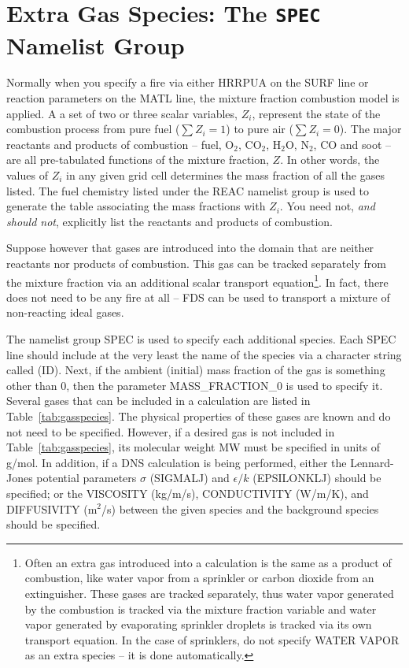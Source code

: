\documentclass[11pt]{book}
\begin{document}
\section{Extra Gas Species: The \texorpdfstring{{\tt SPEC}}{SPEC} Namelist Group}
\label{info:SPEC}

Normally when you specify a fire via either {\ct HRRPUA} on the {\ct SURF} line or
reaction parameters on the {\ct MATL} line, the mixture fraction combustion model
is applied. A a set of two or three scalar variables, $Z_i$, represent the state of
the combustion process from pure fuel ($\sum Z_i=1$) to pure air ($\sum Z_i=0$).
The major reactants and products of combustion -- fuel, O$_2$, CO$_2$,
H$_2$O, N$_2$, CO and soot -- are all pre-tabulated functions of
the mixture fraction, $Z$. In other words, the values of $Z_i$ in any
given grid cell determines the mass fraction of all the gases listed.
The fuel chemistry listed under the {\ct REAC} namelist
group is used to generate the table associating the mass fractions
with $Z_i$. You need not, {\em and should not},
explicitly list the reactants and products of combustion.

Suppose however that gases are introduced into the
domain that are neither reactants nor products of combustion.
This gas can be tracked separately from the mixture fraction via an additional scalar transport equation\footnote{
Often an extra gas introduced into a calculation is the same as a
product of combustion, like water vapor from a sprinkler or carbon
dioxide from an extinguisher. These gases are tracked separately,
thus water vapor generated by the combustion is tracked via the
mixture fraction variable and water vapor generated by evaporating
sprinkler droplets is tracked via its own transport equation. In the
case of sprinklers, do not specify {\ct WATER VAPOR} as
an extra species -- it is done automatically.}.
In fact, there does not need to be any fire
at all -- FDS can be used to transport a mixture of non-reacting
ideal gases.

The namelist group {\ct SPEC} is used to specify each additional
species. Each {\ct SPEC} line should include at the very least
the name of the species via a character string called ({\ct ID}).
Next, if the ambient (initial) mass fraction of the gas is something
other than 0, then the parameter {\ct MASS\_FRACTION\_0} is used to
specify it.
Several gases that can be included in a calculation are listed in
Table~\ref{tab:gasspecies}. The physical properties
of these gases are known and do not need to be specified. However, if a
desired gas is not included in Table~\ref{tab:gasspecies}, its
molecular weight {\ct MW} must be specified in units of g/mol.
In addition, if a DNS calculation is being performed, either
the Lennard-Jones potential parameters $\sigma$ ({\ct SIGMALJ}) and
$\epsilon/k$ ({\ct EPSILONKLJ}) should be specified; or
the {\ct VISCOSITY} (kg/m/s), {\ct CONDUCTIVITY} (W/m/K), and
{\ct DIFFUSIVITY} (m$^2$/s) between the given species
and the background species should be specified.
\end{document}
